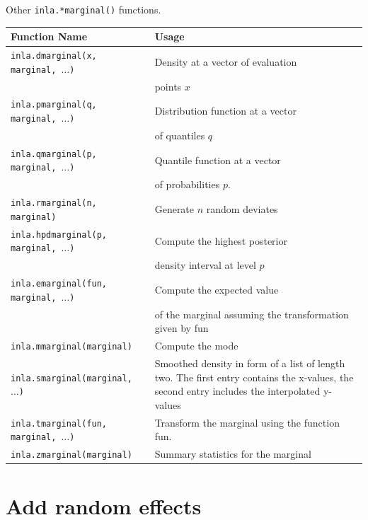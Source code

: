 \documentclass[
  handout]{beamer}
\begin{document}
\begin{frame}{Other \texttt{inla.*marginal()} functions.}
\protect\hypertarget{other-inla.marginal-functions.}{}
\scriptsize
\begin{table}[h]
\centering
    \begin{tabular}{l|p{6cm}}
     \bf{Function Name} & \bf{Usage}\\\hline\hline
      \tt{inla.dmarginal(x, marginal, $\dots$)} & Density at a vector of
      evaluation  \\
      & points $x$ \\
      \tt{inla.pmarginal(q, marginal, $\dots$)} & Distribution function at a vector  \\
      &  of
      quantiles $q$ \\
      \tt{inla.qmarginal(p, marginal, $\dots$)} & Quantile function at a vector \\
      & of
      probabilities $p$.\\
      \tt{inla.rmarginal(n, marginal)} & Generate $n$ random deviates \\
      \tt{inla.hpdmarginal(p, marginal, $\dots$)} & Compute the highest posterior \\
      & density
      interval at level $p$\\
      \tt{inla.emarginal(fun, marginal, $\dots$)} & Compute the expected value \\
      & of the
      marginal assuming the transformation given by fun\\
      \tt{inla.mmarginal(marginal)} & Compute the mode\\
      \tt{inla.smarginal(marginal, $\dots$)} & Smoothed density in
      form of a list of length two. The first entry contains the x-values, the second
      entry includes the interpolated y-values\\
      \tt{inla.tmarginal(fun, marginal, $\dots$)} & Transform the marginal using the
      function fun.\\
      \tt{inla.zmarginal(marginal)} & Summary statistics for the marginal\\
    \end{tabular}
\end{table}
\normalsize
\end{frame}

\hypertarget{add-random-effects}{%
\section{Add random effects}\label{add-random-effects}}
\end{document}
